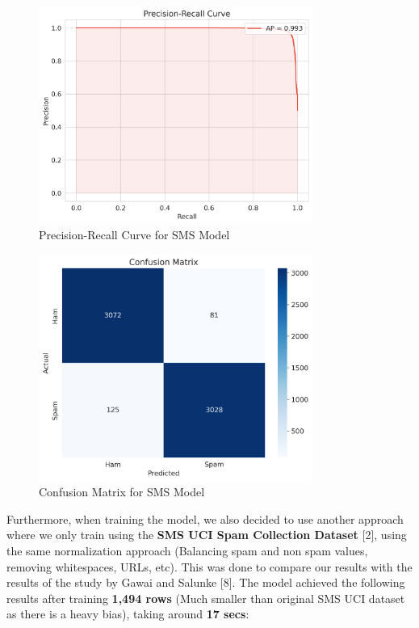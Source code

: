 \documentclass{article}
\begin{document}
\begin{figure}[htbp]
    \centering
    \includegraphics[width=0.8\textwidth]{../analysis/sms/randomforest/precision_recall_curve.png}
    \caption{Precision-Recall Curve for SMS Model}
    \label{fig:precision_recall_curve_2}
\end{figure}

\begin{figure}[htbp]
    \centering
    \includegraphics[width=0.8\textwidth]{../analysis/sms/randomforest/confusion_matrix.png}
    \caption{Confusion Matrix for SMS Model}
    \label{fig:confusion_matrix_2}
\end{figure}

\newpage

\noindent
Furthermore, when training the model, we also decided to use another approach where we only train using the \textbf{SMS UCI Spam Collection Dataset} [2], using the same normalization approach (Balancing spam and non spam values, removing whitespaces, URLs, etc). This was done to compare our results with the results of the study by Gawai and Salunke [8]. The model achieved the following results after training \textbf{1,494 rows} (Much smaller than original SMS UCI dataset as there is a heavy bias), taking around \textbf{17 secs}: 
\end{document}
